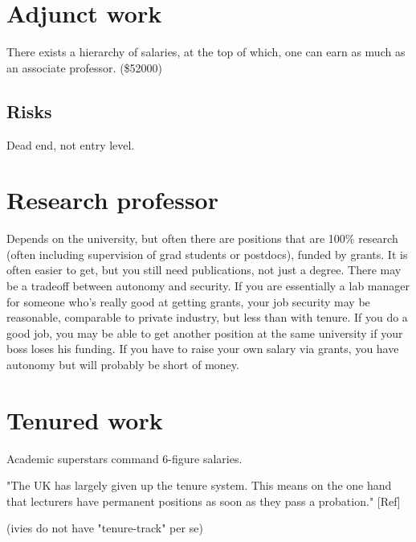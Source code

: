 \documentclass[oneside, article]{memoir}
\begin{document}
\section{Adjunct work}
There exists a hierarchy of salaries, at the top of which, one can earn as much as an associate professor. (\$52000)

\subsection{Risks}
Dead end, not entry level.

\section{Research professor}
Depends on the university, but often there are positions that are 100\% research (often including supervision of grad students or postdocs), funded by grants. It is often easier to get, but you still need publications, not just a degree. There may be a tradeoff between autonomy and security. If you are essentially a lab manager for someone who's really good at getting grants, your job security may be reasonable, comparable to private industry, but less than with tenure.  If you do a good job, you may be able to get another position at the same university if your boss loses his funding.  If you have to raise your own salary via grants, you have autonomy but will probably be short of money.

\section{Tenured work}
Academic superstars command 6-figure salaries.

"The UK has largely given up the tenure system. This means on the one hand that lecturers have permanent positions as soon as they pass a probation." [Ref]

(ivies do not have "tenure-track" per se)
\end{document}
